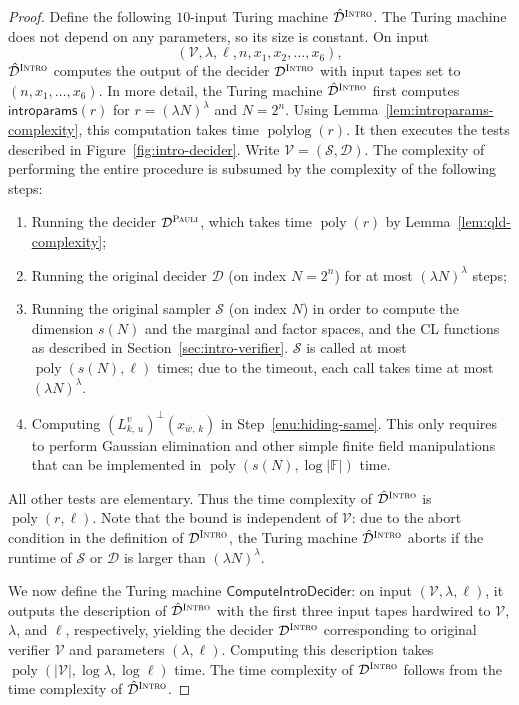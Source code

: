 \documentclass[11pt]{article}
\theoremstyle{definition}
\newcommand{\F}{\ensuremath{\mathbb{F}}}
\DeclareMathOperator{\poly}{poly}
\DeclareMathOperator{\polylog}{polylog}
\newcommand{\abs}[1]{\left\vert {#1} \right\vert}
\newcommand{\sampler}{\mathcal{S}}
\newcommand{\decider}{\mathcal{D}}
\newcommand{\verifier}{\mathcal{V}}
\newcommand{\gamestyle}[1]{\ensuremath{\textsc{#1}}\xspace}
\newcommand{\pauli}{\gamestyle{Pauli}}
\newcommand{\intro}{\gamestyle{Intro}}
\newcommand{\trole}{\ensuremath{v}} %
\renewcommand{\cal}[1]{\mathcal{#1}}
\newcommand{\introparams}{\mathsf{introparams}}
\newcommand{\tmstyle}[1]{\ensuremath{\mathsf{#1}}}
\newcommand{\ComputeIntroDecider}{\tmstyle{ComputeIntroDecider}}
\begin{document}
\begin{proof}
  Define the following $10$-input Turing machine $\hat{\cal{D}}^\intro$.
  The Turing machine does not depend on any parameters, so its size is constant.
  On input
  \begin{equation*}
    (\verifier, \lambda, \ell, n, x_1, x_2, \ldots, x_6),
  \end{equation*}
  $\hat{\cal{D}}^\intro$ computes the output of the decider $\decider^\intro$
  with input tapes set to $(n,x_1,\ldots,x_6)$.
  In more detail, the Turing machine $\hat{\cal{D}}^{\intro}$ first computes
  $\introparams(r)$ for $r=(\lambda N)^\lambda$ and $N=2^n$.
  Using Lemma~\ref{lem:introparams-complexity}, this computation takes time
  $\polylog(r)$.
  It then executes the tests described in Figure~\ref{fig:intro-decider}.
  Write $\verifier = (\sampler, \decider)$.
  The complexity of performing the entire procedure is subsumed by the
  complexity of the following steps:
	\begin{enumerate}
  \item Running the decider $\decider^\pauli$, which takes time $\poly(r)$ by
    Lemma~\ref{lem:qld-complexity};
  \item Running the original decider $\decider$ (on index $N = 2^n$) for at most
    $(\lambda N)^\lambda$ steps;
  \item Running the original sampler $\sampler$ (on index $N$) in order to
    compute the dimension $s(N)$ and the marginal and factor spaces, and the CL
    functions as described in Section~\ref{sec:intro-verifier}.
    $\sampler$ is called at most $\poly(s(N),\ell)$ times; due to the timeout,
    each call takes time at most $(\lambda N)^\lambda$.
  \item Computing $(L^\trole_{k,\, u})^\perp(x_{\overline{w},\, k})$ in
    Step~\ref{enu:hiding-same}.
    This only requires to perform Gaussian elimination and other simple finite
    field manipulations that can be implemented in $\poly(s(N), \log \abs{\F})$
    time.
	\end{enumerate}
  All other tests are elementary.
  Thus the time complexity of $\hat{\cal{D}}^\intro$ is $\poly(r,\ell)$.
  Note that the bound is independent of $\verifier$: due to the abort
  condition in the definition of $\decider^\intro$, the Turing machine
  $\hat{\decider}^\intro$ aborts if the runtime of $\sampler$ or $\decider$ is
  larger than $(\lambda N)^\lambda$.

  We now define the Turing machine $\ComputeIntroDecider$: on input
  $(\verifier,\lambda,\ell)$, it outputs the description of
  $\hat{\cal{D}}^\intro$ with the first three input tapes hardwired to
  $\verifier$, $\lambda$, and $\ell$, respectively, yielding the decider
  $\decider^\intro$ corresponding to original verifier $\verifier$ and
  parameters $(\lambda, \ell)$.
  Computing this description takes $\poly(\abs{\verifier}, \log\lambda, \log
  \ell)$ time.
  The time complexity of $\decider^\intro$ follows from the time complexity of
  $\hat{\cal{D}}^\intro$.
\end{proof}
\end{document}
